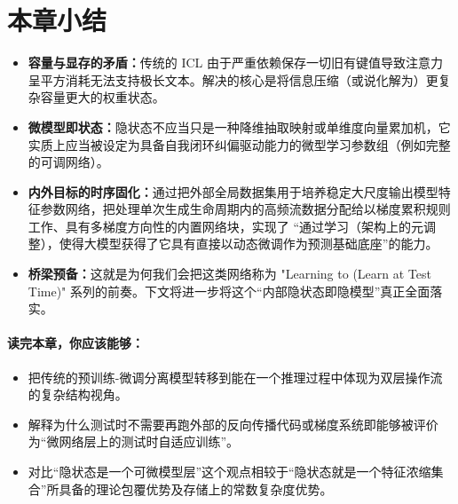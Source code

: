 \section{本章小结}
\label{sec:l2l_summary}

\begin{itemize}
    \item \textbf{容量与显存的矛盾：}传统的 ICL 由于严重依赖保存一切旧有键值导致注意力呈平方消耗无法支持极长文本。解决的核心是将信息压缩（或说化解为）更复杂容量更大的权重状态。
    \item \textbf{微模型即状态：}隐状态不应当只是一种降维抽取映射或单维度向量累加机，它实质上应当被设定为具备自我闭环纠偏驱动能力的微型学习参数组（例如完整的可调网络）。
    \item \textbf{内外目标的时序固化：}通过把外部全局数据集用于培养稳定大尺度输出模型特征参数网络，把处理单次生成生命周期内的高频流数据分配给以梯度累积规则工作、具有多梯度方向性的内置网络块，实现了 “通过学习（架构上的元调整），使得大模型获得了它具有直接以动态微调作为预测基础底座”的能力。
    \item \textbf{桥梁预备：}这就是为何我们会把这类网络称为 "Learning to (Learn at Test Time)" 系列的前奏。下文将进一步将这个“内部隐状态即隐模型”真正全面落实。
\end{itemize}

\paragraph{读完本章，你应该能够：}
\begin{itemize}
    \item 把传统的预训练-微调分离模型转移到能在一个推理过程中体现为双层操作流的复杂结构视角。
    \item 解释为什么测试时不需要再跑外部的反向传播代码或梯度系统即能够被评价为“微网络层上的测试时自适应训练”。
    \item 对比“隐状态是一个可微模型层”这个观点相较于“隐状态就是一个特征浓缩集合”所具备的理论包覆优势及存储上的常数复杂度优势。
\end{itemize}

